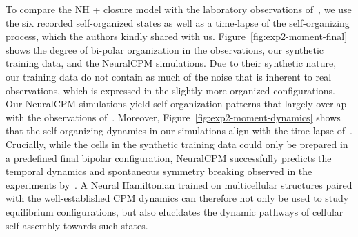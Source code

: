 To compare the NH + closure model with the laboratory observations of~\citet{Toda2018Science}, we use the six recorded self-organized states as well as a time-lapse of the self-organizing process, which the authors kindly shared with us. Figure~\ref{fig:exp2-moment-final} shows the degree of bi-polar organization in the observations, our synthetic training data, and the NeuralCPM simulations. Due to their synthetic nature, our training data do not contain as much of the noise that is inherent to real observations, which is expressed in the slightly more organized configurations. Our NeuralCPM simulations yield self-organization patterns that largely overlap with the observations of~\citet{Toda2018Science}. Moreover, Figure~\ref{fig:exp2-moment-dynamics} shows that the self-organizing dynamics in our simulations align with the time-lapse of~\citet{Toda2018Science}. Crucially, while the cells in the synthetic training data could only be prepared in a predefined final bipolar configuration, NeuralCPM successfully predicts the temporal dynamics and spontaneous symmetry breaking observed in the experiments by~\citet{Toda2018Science}. A Neural Hamiltonian trained on multicellular structures paired with the well-established CPM dynamics can therefore not only be used to study equilibrium configurations, but also elucidates the dynamic pathways of cellular self-assembly towards such states.














